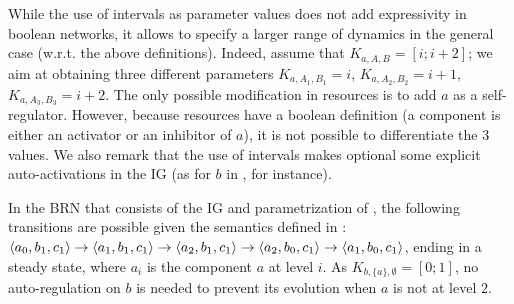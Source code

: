 While the use of intervals as parameter values does not add expressivity in boolean
networks, it allows to specify a larger range of dynamics in the general case (w.r.t. the above
definitions).
Indeed, assume that $K_{a,A,B} = [i ; i+2]$;
we aim at obtaining three different parameters $K_{a,A_1,B_1} = i$,  $K_{a,A_2,B_2} = i+1$,
$K_{a,A_3,B_3} = i+2$.
The only possible modification in resources is to add $a$ as a self-regulator.
However, because resources have a boolean definition (a component is either an activator or an inhibitor of
$a$), it is not possible to differentiate the 3 values.
We also remark that the use of intervals makes optional some explicit auto-activations in the IG
(as for $b$ in , for instance).

\begin{example*}
In the BRN that consists of the IG and parametrization of , the following
transitions are possible given the semantics defined in :
$\mbox{$\langle a_0, b_1, c_1 \rangle$} \rightarrow \mbox{$\langle a_1, b_1, c_1 \rangle$} \rightarrow \mbox{$\langle a_2, b_1, c_1 \rangle$} \rightarrow
\mbox{$\langle a_2, b_0, c_1 \rangle$} \rightarrow \mbox{$\langle a_1, b_0, c_1 \rangle$}$,
ending in a steady state,
where $a_i$ is the component $a$ at level $i$.
As $K_{b,\{a\},\emptyset} = [0 ; 1]$, no auto-regulation on $b$ is needed to prevent its evolution when $a$ is not at level $2$.
\end{example*}

